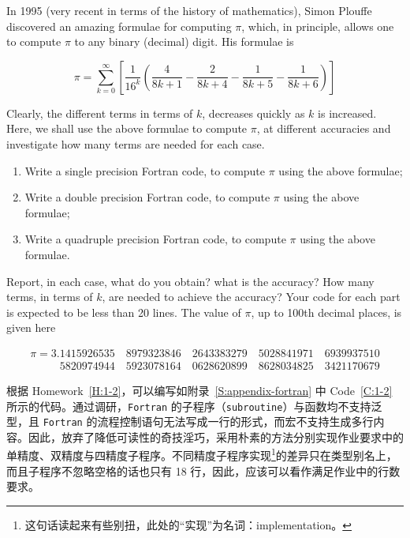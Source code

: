 \begin{homework}[label={H:1-2}]
    In 1995 (very recent in terms of the history of mathematics), Simon Plouffe discovered an amazing formulae for computing $\pi$, which, in principle, allows one to compute $\pi$ to any binary (decimal) digit. His formulae is

    \[
        \pi = \sum_{k=0}^{\infty} \left[
            \frac{1}{16^k} \left(
                \frac{4}{8k+1} - \frac{2}{8k+4} - \frac{1}{8k+5} - \frac{1}{8k+6}
            \right)
        \right]
    \]

    Clearly, the different terms in terms of $k$, decreases quickly as $k$ is increased. Here, we shall use the above formulae to compute $\pi$, at different accuracies and investigate how many terms are needed for each case.

    \begin{enumerate}[label=(\alph*)]
        \item Write a single precision Fortran code, to compute $\pi$ using the above formulae;
        \item Write a double precision Fortran code, to compute $\pi$ using the above formulae;
        \item Write a quadruple precision Fortran code, to compute $\pi$ using the above formulae.
    \end{enumerate}

    Report, in each case, what do you obtain? what is the accuracy? How many terms, in terms of $k$, are needed to achieve the accuracy? Your code for each part is expected to be less than 20 lines. The value of $\pi$, up to 100th decimal places, is given here

    \begin{align*}
        \pi =              3.1415926535 \quad 8979323846 \quad 2643383279 \quad 5028841971 \quad 6939937510 \\
            \phantom{\pi=3.} 5820974944 \quad 5923078164 \quad 0628620899 \quad 8628034825 \quad 3421170679
    \end{align*}
\end{homework}

根据 Homework~\ref{H:1-2}，可以编写如附录~\ref{S:appendix-fortran} 中 Code~\ref{C:1-2} 所示的代码。通过调研，\texttt{Fortran} 的子程序（\texttt{subroutine}）与函数均不支持泛型，且 \texttt{Fortran} 的流程控制语句无法写成一行的形式，而宏不支持生成多行内容。因此，放弃了降低可读性的奇技淫巧，采用朴素的方法分别实现作业要求中的单精度、双精度与四精度子程序。不同精度子程序实现\footnote{这句话读起来有些别扭，此处的“实现”为名词：implementation。}的差异只在类型别名上，而且子程序不忽略空格的话也只有 18 行，因此，应该可以看作满足作业中的行数要求。

